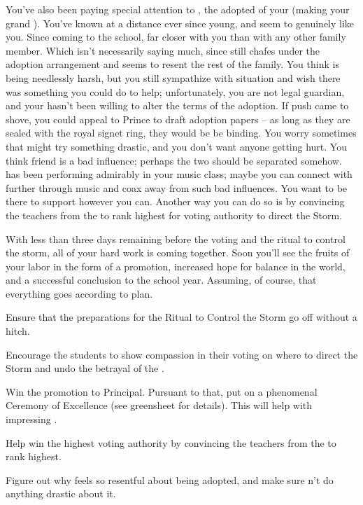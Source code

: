 \documentclass[char]{GL2020}
\begin{document}
You've also been paying special attention to \cAdopted{\full}, the adopted \cAdopted{\child} of your \cAdoptedParentOne{\nibling} (making \cAdopted{} your grand \cAdopted{\nibling}). You've known \cAdopted{} at a distance ever since \cAdopted{\they} \cAdopted{\were} young, and \cAdopted{\they} seem\cAdopted{\plural} to genuinely like you. Since coming to the school, \cAdopted{\theyare} far closer with you than with any other family member. Which isn't necessarily saying much, since \cAdopted{} still chafes under the adoption arrangement and seems to resent the rest of the family. You think \cAdopted{} is being needlessly harsh, but you still sympathize with \cAdopted{\their} situation and wish there was something you could do to help; unfortunately, you are not \cAdopted{\their} legal guardian, and your \cAdoptedParentOne{\nibling} hasn't been willing to alter the terms of the adoption. If push came to shove, you could appeal to Prince \cPrince{} to draft adoption papers – as long as they are sealed with the royal signet ring, they would be be binding. You worry sometimes that \cAdopted{} might try something drastic, and you don't want anyone getting hurt. You think \cAdopted{\their} friend \cLibAssist{\full} is a bad influence; perhaps the two should be separated somehow. \cAdopted{} has been performing admirably in your music class; maybe you can connect with \cAdopted{\them} further through music and coax \cAdopted{\them} away from such bad influences. You want to be there to support \cAdopted{} however you can. Another way you can do so is by convincing the teachers from the \pTech{} to rank \cAdopted{\them} highest for voting authority to direct the Storm.

With less than three days remaining before the voting and the ritual to control the storm, all of your hard work is coming together. Soon you'll see the fruits of your labor in the form of a promotion, increased hope for balance in the world, and a successful conclusion to the school year. Assuming, of course, that everything goes according to plan.

\begin{itemz}
	\item Ensure that the preparations for the Ritual to Control the Storm go off without a hitch.
	\item Encourage the students to show compassion in their voting on where to direct the Storm and undo the betrayal of the \pShip{}.
	\item Win the promotion to Principal. Pursuant to that, put on a phenomenal Ceremony of Excellence (see greensheet for details). This will help with impressing \cPrincipal{}.
	\item Help \cAdopted{} win the highest voting authority by convincing the teachers from the \pTech{} to rank \cAdopted{\them} highest.
	\item Figure out why \cAdopted{} feels so resentful about being adopted, and make sure \cAdopted{\they} \cAdopted{\does}n't do anything drastic about it.
\end{itemz}
\end{document}

